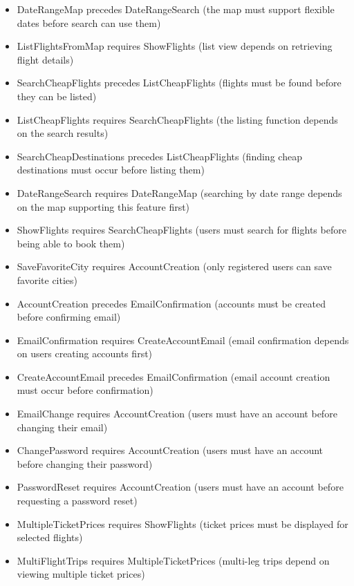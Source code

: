 \begin{itemize}
    \item DateRangeMap precedes DateRangeSearch (the map must support flexible dates before search can use them)
    \item ListFlightsFromMap requires ShowFlights (list view depends on retrieving flight details)
    \item SearchCheapFlights precedes ListCheapFlights (flights must be found before they can be listed)
    \item ListCheapFlights requires SearchCheapFlights (the listing function depends on the search results)
    \item SearchCheapDestinations precedes ListCheapFlights (finding cheap destinations must occur before listing them)
    \item DateRangeSearch requires DateRangeMap (searching by date range depends on the map supporting this feature first)
    \item ShowFlights requires SearchCheapFlights (users must search for flights before being able to book them)
    \item SaveFavoriteCity requires AccountCreation (only registered users can save favorite cities)
    \item AccountCreation precedes EmailConfirmation (accounts must be created before confirming email)
    \item EmailConfirmation requires CreateAccountEmail (email confirmation depends on users creating accounts first)
    \item CreateAccountEmail precedes EmailConfirmation (email account creation must occur before confirmation)
    \item EmailChange requires AccountCreation (users must have an account before changing their email)
    \item ChangePassword requires AccountCreation (users must have an account before changing their password)
    \item PasswordReset requires AccountCreation (users must have an account before requesting a password reset)
    \item MultipleTicketPrices requires ShowFlights (ticket prices must be displayed for selected flights)
    \item MultiFlightTrips requires MultipleTicketPrices (multi-leg trips depend on viewing multiple ticket prices)
\end{itemize}

